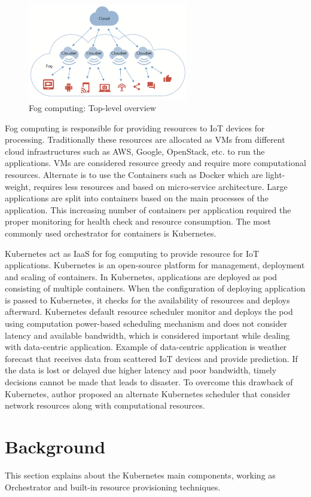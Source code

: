 \begin{figure}
  \includegraphics[width=70mm]{figures/mlcn-fog-1.pdf}
  \caption{Fog computing: Top-level overview\cite{Bittencourt2017}}
  \label{fig:fog-arch}
\end{figure}
Fog computing is responsible for providing resources to IoT devices for processing. Traditionally these resources are allocated as VMs from different cloud infrastructures such as AWS, Google, OpenStack, etc. to run the applications. VMs are considered resource greedy and require more computational resources. Alternate is to use the Containers such as Docker which are light-weight, requires less resources and based on micro-service architecture. Large applications are split into containers based on the main processes of the application. This increasing number of containers per application required the proper monitoring for health check and resource consumption. The most commonly used orchestrator for containers is Kubernetes. \par
Kubernetes act as IaaS for fog computing to provide resource for IoT applications. Kubernetes is an open-source platform for management, deployment and scaling of containers. In Kubernetes, applications are deployed as pod consisting of multiple containers. When the configuration of deploying application is passed to Kubernetes, it checks for the availability of resources and deploys afterward. Kubernetes default resource scheduler monitor and deploys the pod using computation power-based scheduling mechanism and does not consider latency and available bandwidth, which is considered important while dealing with data-centric application. Example of data-centric application is weather forecast that receives data from scattered IoT devices and provide prediction. If the data is lost or delayed due higher latency and poor bandwidth, timely decisions cannot be made that leads to disaster. To overcome this drawback of Kubernetes, author proposed an alternate Kubernetes scheduler that consider network resources along with computational resources.
\section{Background}
\label{sec:backgroud}
This section explains about the Kubernetes main components, working as Orchestrator and built-in resource provisioning techniques.
